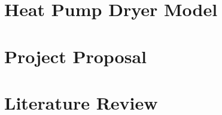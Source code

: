 \documentclass[12pt]{report}
\begin{document}


\begin{appendices}

\chapter{Heat Pump Dryer Model} \label{app:heatpumpmodel}


\chapter{Project Proposal} \label{sec:proposal}




\chapter{Literature Review} \label{sec:litreview}


\end{appendices}
\end{document}
